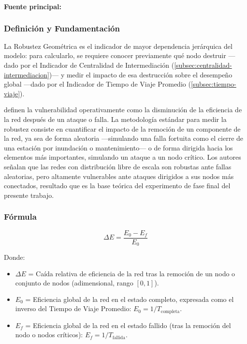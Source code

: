 \textbf{Fuente principal:} \textcite{loterovélez2014}

\subsubsection{Definición y Fundamentación}

La Robustez Geométrica es el indicador de mayor dependencia jerárquica del
modelo: para calcularlo, se requiere conocer previamente qué nodo destruir ---dado
por el Indicador de Centralidad de Intermediación
(\autoref{subsec:centralidad-intermediacion})--- y medir el impacto de esa destrucción
sobre el desempeño global ---dado por el Indicador de Tiempo de Viaje Promedio
(\autoref{subsec:tiempo-viaje})\DIFaddbegin \DIFadd{---}\DIFaddend .

\textcite{loterovélez2014} definen la vulnerabilidad operativamente como la
disminución de la eficiencia de la red después de un ataque o falla. La metodología
estándar para medir la robustez consiste en cuantificar el impacto de la remoción de
un componente de la red, ya sea de forma aleatoria ---simulando una falla fortuita
como el cierre de una estación por inundación o mantenimiento--- o de forma dirigida
hacia los elementos más importantes, simulando un ataque a un nodo crítico. Los
autores señalan que las redes con distribución libre de escala son robustas ante
fallas aleatorias, pero altamente vulnerables ante ataques dirigidos a sus nodos más
conectados, resultado que es la base teórica del experimento de fase final del
presente trabajo.

\subsubsection{Fórmula}

\begin{equation}
    \Delta E = \frac{E_0 - E_f}{E_0}
    \label{eq:robustez}
\end{equation}

Donde:
\begin{itemize}
    \item $\Delta E$ = Caída relativa de eficiencia de la red tras la remoción de un
    nodo o conjunto de nodos (adimensional, rango $[0, 1]$).
    \item $E_0$ = Eficiencia global de la red en el estado completo, expresada como
    el inverso del Tiempo de Viaje Promedio:
    $E_0 = 1 / T_{\text{completa}}$.
    \item $E_f$ = Eficiencia global de la red en el estado fallido (tras la remoción
    del nodo o nodos críticos):
    $E_f = 1 / T_{\text{fallida}}$.
\end{itemize}

